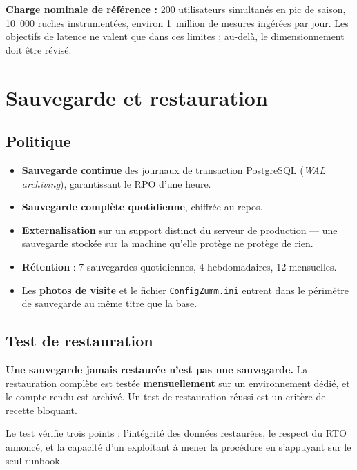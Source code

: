 \begin{encadre}
\textbf{Charge nominale de référence :} 200 utilisateurs simultanés en pic de
saison, 10~000 ruches instrumentées, environ 1~million de mesures ingérées par
jour. Les objectifs de latence ne valent que dans ces limites ; au-delà, le
dimensionnement doit être révisé.
\end{encadre}

\section{Sauvegarde et restauration}
\subsection{Politique}
\begin{itemize}
  \item \textbf{Sauvegarde continue} des journaux de transaction PostgreSQL
        (\emph{WAL archiving}), garantissant le RPO d'une heure.
  \item \textbf{Sauvegarde complète quotidienne}, chiffrée au repos.
  \item \textbf{Externalisation} sur un support distinct du serveur de
        production --- une sauvegarde stockée sur la machine qu'elle protège ne
        protège de rien.
  \item \textbf{Rétention} : 7 sauvegardes quotidiennes, 4 hebdomadaires,
        12 mensuelles.
  \item Les \textbf{photos de visite} et le fichier \texttt{ConfigZumm.ini}
        entrent dans le périmètre de sauvegarde au même titre que la base.
\end{itemize}

\subsection{Test de restauration}
\begin{encadre}
\textbf{Une sauvegarde jamais restaurée n'est pas une sauvegarde.} La
restauration complète est testée \textbf{mensuellement} sur un environnement
dédié, et le compte rendu est archivé. Un test de restauration réussi est un
critère de recette bloquant.
\end{encadre}

Le test vérifie trois points : l'intégrité des données restaurées, le respect
du RTO annoncé, et la capacité d'un exploitant à mener la procédure en
s'appuyant sur le seul runbook.

